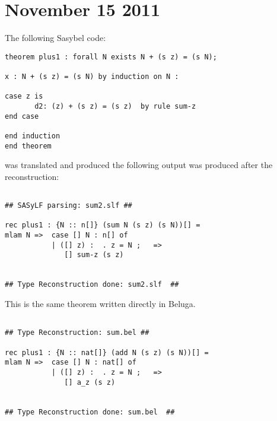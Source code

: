 \documentclass[12pt]{article}
\begin{document}
\section{November 15 2011}
The following \textmd{Sasybel} code:
\begin{verbatim}
theorem plus1 : forall N exists N + (s z) = (s N);

x : N + (s z) = (s N) by induction on N : 

case z is
	   d2: (z) + (s z) = (s z) 	by rule sum-z
end case

end induction
end theorem 

\end{verbatim}
was translated and produced the following output was produced after the reconstruction:
\begin{verbatim}

## SASyLF parsing: sum2.slf ##

rec plus1 : {N :: n[]} (sum N (s z) (s N))[] = 
mlam N =>  case [] N : n[] of 
           | ([] z) :  . z = N ;   => 
              [] sum-z (s z)
           

## Type Reconstruction done: sum2.slf  ##

\end{verbatim}
This is the same theorem written directly in \textmd{Beluga}.
\begin{verbatim}

## Type Reconstruction: sum.bel ##

rec plus1 : {N :: nat[]} (add N (s z) (s N))[] = 
mlam N =>  case [] N : nat[] of 
           | ([] z) :  . z = N ;   => 
              [] a_z (s z)
           

## Type Reconstruction done: sum.bel  ##

\end{verbatim}
\end{document}
